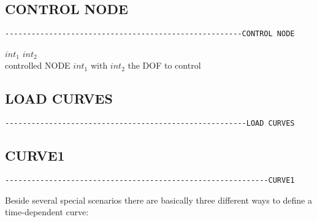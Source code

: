 \subsection{CONTROL NODE}
\begin{verbatim}
------------------------------------------------------CONTROL NODE
\end{verbatim}

 $int_1$  $int_2$\\
controlled NODE $int_1$ with $int_2$ the DOF to control

\subsection{LOAD CURVES}
\begin{verbatim}
-------------------------------------------------------LOAD CURVES
\end{verbatim}


\subsection{CURVE1}
\begin{verbatim}
------------------------------------------------------------CURVE1
\end{verbatim}
Beside several special scenarios there are basically three different ways to define a time-dependent curve:

